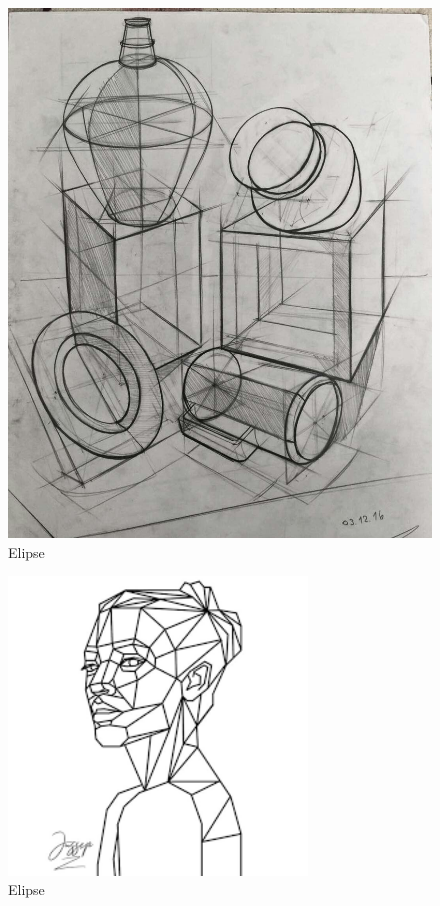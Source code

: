 \documentclass[16pt,]{krantz}
\theoremstyle{definition}
\theoremstyle{definition}
\theoremstyle{definition}
\theoremstyle{definition}
\theoremstyle{remark}
\begin{document}
\begin{figure}[!ht]

{\centering \includegraphics{geometrizacion} 

}

\caption{Elipse}\label{fig:geometrizacion-1}
\end{figure}
\begin{figure}[!ht]

{\centering \includegraphics[width=3.12in]{images} 

}

\caption{Elipse}\label{fig:geometrizacion-2}
\end{figure}
\end{document}
